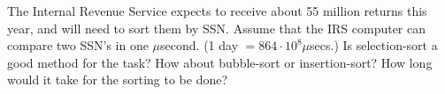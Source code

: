 The Internal Revenue Service expects to receive about 55 million
returns this year, and will need to sort them by SSN. Assume that the
IRS computer can compare two SSN's in one $\mu$second.  (1 day $ =
864\cdot  10^8 \mu$secs.)  Is selection-sort a good method for the task?
How about bubble-sort or insertion-sort?  How long would it take for
the sorting to be done?
